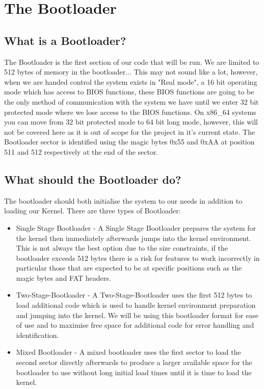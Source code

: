 \documentclass[10pt,a4paper]{article}
\begin{document}
\section{The Bootloader}
\subsection{What is a Bootloader?}
The Bootloader is the first section of our code that will be run. We are limited to 512 bytes of memory in the bootloader... This may not sound like a lot, however, when we are handed control the system exists in "Real mode", a 16 bit operating mode which has access to BIOS functions, these BIOS functions are going to be the only method of communication with the system we have until we enter 32 bit protected mode where we lose access to the BIOS functions. On x86\_64 systems you can move from 32 bit protected mode to 64 bit long mode, however, this will not be covered here as it is out of scope for the project in it's current state. The Bootloader sector is identified using the magic bytes 0x55 and 0xAA at position 511 and 512 respectively at the end of the sector.

\subsection{What should the Bootloader do?}
The bootloader should both initialise the system to our needs in addition to loading our Kernel. There are three types of Bootloader:
\begin{itemize}
	\item Single Stage Bootloader - A Single Stage Bootloader prepares the system for the kernel then immediately afterwards jumps into the kernel environment. This is not always the best option due to the size constraints, if the bootloader exceeds 512 bytes there is a risk for features to work incorrectly in particular those that are expected to be at specific positions such as the magic bytes and FAT headers.
	\item Two-Stage-Bootloader - A Two-Stage-Bootloader uses the first 512 bytes to load additional code which is used to handle kernel environment preparation and jumping into the kernel. We will be using this bootloader format for ease of use and to maximise free space for additional code for error handling and identification.
	\item Mixed Bootloader - A mixed bootloader uses the first sector to load the second sector directly afterwards to produce a larger available space for the bootloader to use without long initial load times until it is time to load the kernel.
\end{itemize}
\end{document}
